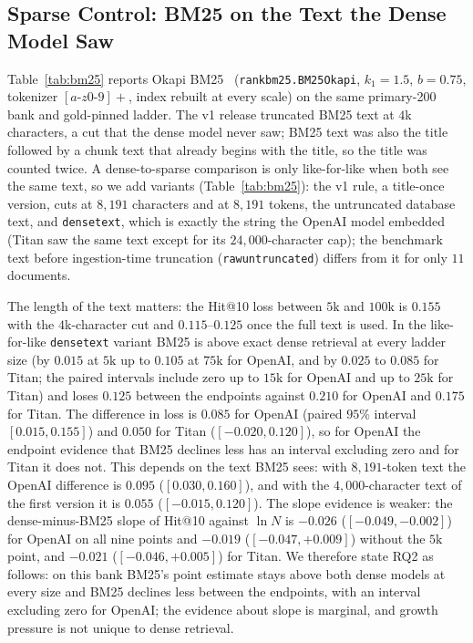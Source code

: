 \documentclass{ieeeaccess}
\makeatletter
\DeclareRobustCommand{\_}{\ifmmode\nfss@text{\textunderscore}\else\textunderscore\allowbreak\fi}
\makeatother
\begin{document}




\subsection{Sparse Control: BM25 on the Text the Dense Model Saw}
\label{sec:bm25}
Table~\ref{tab:bm25} reports Okapi BM25~\cite{robertson2009bm25} (\texttt{rank\_bm25.BM25Okapi}, $k_1{=}1.5$, $b{=}0.75$, tokenizer $[a\text{-}z0\text{-}9]+$, index rebuilt at every scale) on the same primary-200 bank and gold-pinned ladder. The v1 release truncated BM25 text at $4$k characters, a cut that the dense model never saw; BM25 text was also the title followed by a chunk text that already begins with the title, so the title was counted twice. A dense-to-sparse comparison is only like-for-like when both see the same text, so we add variants (Table~\ref{tab:bm25}): the v1 rule, a title-once version, cuts at $8{,}191$ characters and at $8{,}191$ tokens, the untruncated database text, and \texttt{dense\_text}, which is exactly the string the OpenAI model embedded (Titan saw the same text except for its $24{,}000$-character cap); the benchmark text before ingestion-time truncation (\texttt{raw\_untruncated}) differs from it for only $11$ documents.

The length of the text matters: the Hit@10 loss between $5\text{k}$ and $100\text{k}$ is $0.155$ with the $4$k-character cut and $0.115$--$0.125$ once the full text is used. In the like-for-like \texttt{dense\_text} variant BM25 is above exact dense retrieval at every ladder size (by $0.015$ at $5\text{k}$ up to $0.105$ at $75\text{k}$ for OpenAI, and by $0.025$ to $0.085$ for Titan; the paired intervals include zero up to $15\text{k}$ for OpenAI and up to $25\text{k}$ for Titan) and loses $0.125$ between the endpoints against $0.210$ for OpenAI and $0.175$ for Titan. The difference in loss is $0.085$ for OpenAI (paired $95\%$ interval $[0.015,0.155]$) and $0.050$ for Titan ($[-0.020,0.120]$), so for OpenAI the endpoint evidence that BM25 declines less has an interval excluding zero and for Titan it does not. This depends on the text BM25 sees: with $8{,}191$-token text the OpenAI difference is $0.095$ ($[0.030,0.160]$), and with the $4{,}000$-character text of the first version it is $0.055$ ($[-0.015,0.120]$). The slope evidence is weaker: the dense-minus-BM25 slope of Hit@10 against $\ln N$ is $-0.026$ ($[-0.049,-0.002]$) for OpenAI on all nine points and $-0.019$ ($[-0.047,+0.009]$) without the $5\text{k}$ point, and $-0.021$ ($[-0.046,+0.005]$) for Titan. We therefore state RQ2 as follows: on this bank BM25's point estimate stays above both dense models at every size and BM25 declines less between the endpoints, with an interval excluding zero for OpenAI; the evidence about slope is marginal, and growth pressure is not unique to dense retrieval.
\end{document}
